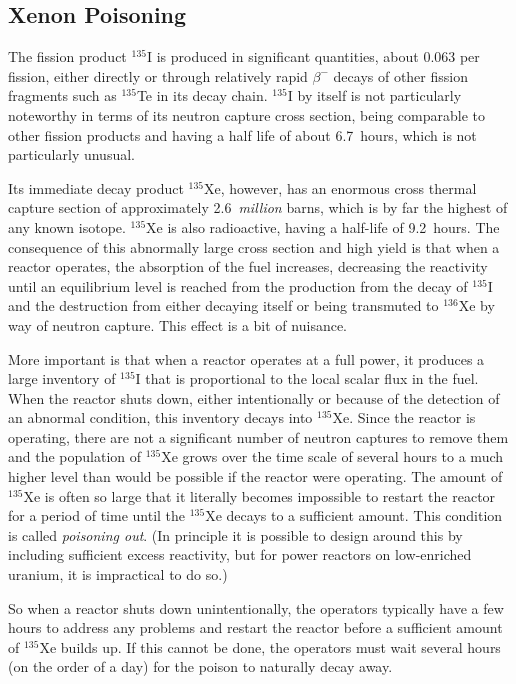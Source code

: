 \subsection{Xenon Poisoning}

The fission product $^{135}$I is produced in significant quantities, about 0.063 per fission, either directly or through relatively rapid $\beta^-$ decays of other fission fragments such as $^{135}$Te in its decay chain. $^{135}$I by itself is not particularly noteworthy in terms of its neutron capture cross section, being comparable to other fission products and having a half life of about 6.7~hours, which is not particularly unusual. 

Its immediate decay product $^{135}$Xe, however, has an enormous cross thermal capture section of approximately 2.6~\emph{million} barns, which is by far the highest of any known isotope. $^{135}$Xe is also radioactive, having a half-life of 9.2~hours. The consequence of this abnormally large cross section and high yield is that when a reactor operates, the absorption of the fuel increases, decreasing the reactivity until an equilibrium level is reached from the production from the decay of $^{135}$I and the destruction from either decaying itself or being transmuted to $^{136}$Xe by way of neutron capture. This effect is a bit of nuisance. 

More important is that when a reactor operates at a full power, it produces a large inventory of $^{135}$I that is proportional to the local scalar flux in the fuel. When the reactor shuts down, either intentionally or because of the detection of an abnormal condition, this inventory decays into $^{135}$Xe. Since the reactor is operating, there are not a significant number of neutron captures to remove them and the population of  $^{135}$Xe grows over the time scale of several hours to a much higher level than would be possible if the reactor were operating. The amount of $^{135}$Xe is often so large that it literally becomes impossible to restart the reactor for a period of time until the $^{135}$Xe decays to a sufficient amount. This condition is called \emph{poisoning out}. (In principle it is possible to design around this by including sufficient excess reactivity, but for power reactors on low-enriched uranium, it is impractical to do so.)

So when a reactor shuts down unintentionally, the operators typically have a few hours to address any problems and restart the reactor before a sufficient amount of $^{135}$Xe builds up. If this cannot be done, the operators must wait several hours (on the order of a day) for the poison to naturally decay away.

